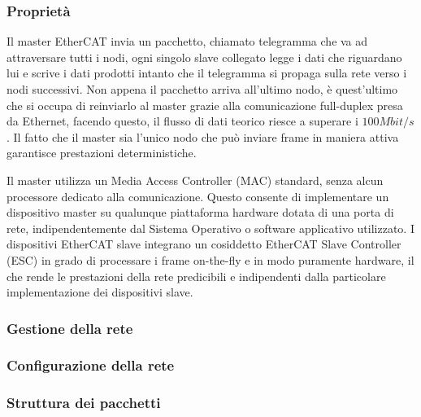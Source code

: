 \subsubsection{Proprietà}
Il master EtherCAT invia un pacchetto, chiamato telegramma che va ad attraversare tutti i nodi, ogni singolo slave collegato legge i dati che riguardano lui e scrive i dati prodotti intanto che il telegramma si propaga sulla rete verso i nodi successivi. Non appena il pacchetto arriva all'ultimo nodo, è quest'ultimo che si occupa di reinviarlo al master grazie alla comunicazione full-duplex presa da Ethernet, facendo questo, il flusso di dati teorico riesce a superare i $100 Mbit/s$. Il fatto che il master sia l'unico nodo che può inviare frame in maniera attiva garantisce prestazioni deterministiche.  


Il master utilizza un Media Access Controller (MAC) standard, senza alcun processore dedicato alla comunicazione. Questo consente di implementare un dispositivo master su qualunque piattaforma hardware dotata di una porta di rete, indipendentemente dal Sistema Operativo o software applicativo utilizzato. I dispositivi EtherCAT slave integrano un cosiddetto EtherCAT Slave Controller (ESC) in grado di processare i frame on-the-fly e in modo puramente hardware, il che rende le prestazioni della rete predicibili e indipendenti dalla particolare implementazione dei dispositivi slave.
\subsubsection{Gestione della rete}
\subsubsection{Configurazione della rete}
\subsubsection{Struttura dei pacchetti}

